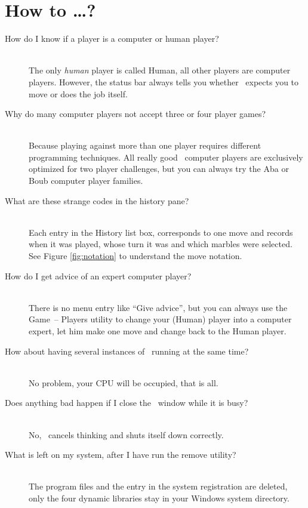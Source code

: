 \section{How to \ldots?}
\begin{description}
\item[How do I know if a player is a computer or human player?] \hfill \\ The only \emph{human} player is called {\sf Human}, all other players are computer players. However, the status bar always tells you whether \Malin\ expects you to move or does the job itself.
\item[Why do many computer players not accept three or four player games?]\hfill \\  Because playing against more than one player requires different programming techniques. All really good \Malin\ computer players are exclusively optimized for two player challenges, but you can always try the {\sf Aba} or {\sf Boub} computer player families.
\item[What are these strange codes in the history pane?] \hfill \\ Each entry in the {\sf History} list box, corresponds to one move and records when it was played, whose turn it was and which marbles were selected. See Figure \ref{fig:notation} to understand the move notation.
\item[How do I get advice of an expert computer player?] \hfill \\ There is no menu entry like ``Give advice'', but you can always use the {\sf Game}~-- {\sf Players} utility to change your ({\sf Human}) player into a computer expert, let him make one move and change back to the {\sf Human} player.
\item[How about having several instances of \Malin\ running at the same time?] \hfill \\ No problem, your CPU will be occupied, that is all.
\item[Does anything bad happen if I close the \Malin\ window while it is busy?] \hfill \\ No, \Malin\ cancels thinking and shuts itself down correctly.
\item[What is left on my system, after I have run the remove utility?] \hfill \\ The program files and the entry in the system registration are deleted, only the four dynamic libraries stay in your Windows system directory.
\end{description}

